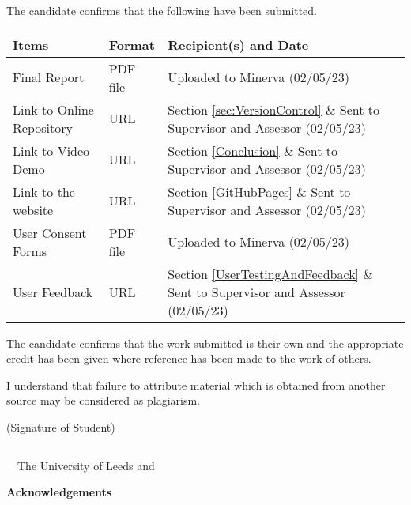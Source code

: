 \frontcover

\clearpage

\noindent The candidate confirms that the following have been submitted.\\


\begin{table}[ht!]
\begin{tabular}{|p{}|p{}|p{}|}
\hline 
Items & Format & Recipient(s) and Date \\ 
\hline 
Final Report & PDF file & Uploaded to Minerva (02/05/23) \\ 
\hline 
Link to Online Repository & URL & Section \ref{sec:VersionControl} \& Sent to Supervisor and Assessor (02/05/23) \\
\hline
Link to Video Demo & URL & Section \ref{Conclusion} \& Sent to Supervisor and Assessor (02/05/23) \\
\hline
Link to the website & URL & Section \ref{GitHubPages} \& Sent to Supervisor and Assessor (02/05/23) \\
\hline
User Consent Forms & PDF file & Uploaded to Minerva (02/05/23) \\
\hline
User Feedback & URL & Section \ref{UserTestingAndFeedback} \& Sent to Supervisor and Assessor (02/05/23) \\
\hline
\end{tabular} 
\end{table}


\vfill

\noindent The candidate confirms that the work submitted is their own and the appropriate credit has been given where reference has been made to the work of others.

\vfill

\noindent I understand that failure to attribute material which is obtained from another source may be considered as plagiarism.

\vfill

\flushright(Signature of Student) \rule{50mm}{1pt}
\flushleft

\vfill

\textcopyright~\session~The University of Leeds and~\fullname

\begin{dissertationsummary}

\end{dissertationsummary}

\clearpage
\centering\textbf{Acknowledgements}
\flushleft


\tableofcontents

\clearpage

